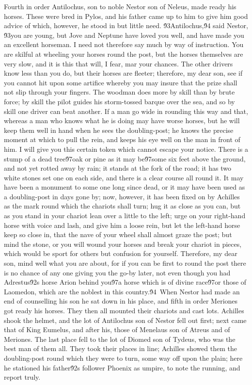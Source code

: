 {Fourth in order Antilochus, son to noble Nestor son of Neleus, made ready his horses. These were bred in Pylos, and his father came up to him to give him good advice of which, however, he stood in but little need. \'93Antilochus,\'94 said Nestor, \'93you are young, but Jove and Neptune have loved you well, and have made you an excellent horseman. I need not therefore say much by way of instruction. You are skilful at wheeling your horses round the post, but the horses themselves are very slow, and it is this that will, I fear, mar your chances. The other drivers know less than you do, but their horses are fleeter; therefore, my dear son, see if you cannot hit upon some artifice whereby you may insure that the prize shall not slip through your fingers. The woodman does more by skill than by brute force; by skill the pilot guides his storm-tossed barque over the sea, and so by skill one driver can beat another. If a man go wide in rounding this way and that, whereas a man who knows what he is doing may have worse horses, but he will keep them well in hand when he sees the doubling-post; he knows the precise moment at which to pull the rein, and keeps his eye well on the man in front of him. I will give you this certain token which cannot escape your notice. There is a stump of a dead tree\'97oak or pine as it may be\'97some six feet above the ground, and not yet rotted away by rain; it stands at the fork of the road; it has two white stones set one on each side, and there is a clear course all round it. It may have been a monument to some one long since dead, or it may have been used as a doubling-post in days gone by; now, however, it has been fixed on by Achilles as the mark round which the chariots shall turn; hug it as close as you can, but as you stand in your chariot lean over a little to the left; urge on your right-hand horse with voice and lash, and give him a loose rein, but let the left-hand horse keep so close in, that the nave of your wheel shall almost graze the post; but mind the stone, or you will wound your horses and break your chariot in pieces, which would be sport for others but confusion for yourself. Therefore, my dear son, mind well what you are about, for if you can be first to round the post there is no chance of any one giving you the go-by later, not even though you had Adrestus\'92s horse Arion behind you\'97a horse which is of divine race\'97or those of Laomedon, which are the noblest in this country.\'94\
When Nestor had made an end of counselling his son he sat down in his place, and fifth in order Meriones got ready his horses. They then all mounted their chariots and cast lots. Achilles shook the helmet, and the lot of Antilochus son of Nestor fell out first; next came that of King Eumelus, and after his, those of Menelaus son of Atreus and of Meriones. The last place fell to the lot of Diomed son of Tydeus, who was the best man of them all. They took their places in line; Achilles showed them the doubling-post round which they were to turn, some way off upon the plain; here he stationed his father\'92s follower Phoenix as umpire, to note the running, and report truly.\
}
